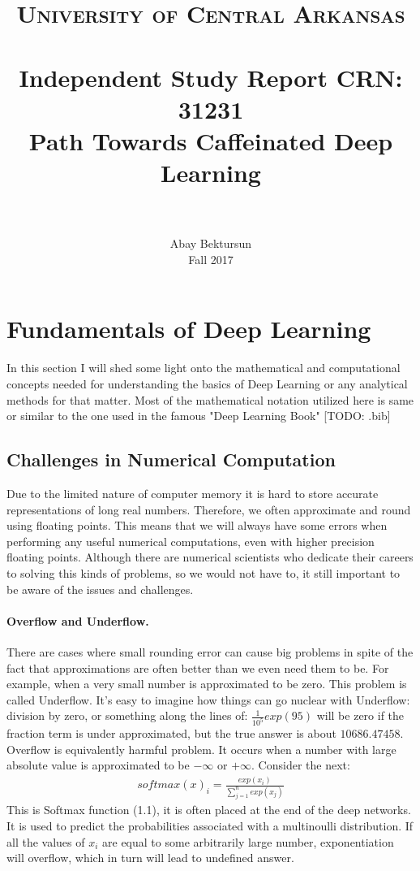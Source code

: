 \documentclass[paper=a4, fontsize=11pt]{scrartcl}
\title{
	\usefont{OT1}{bch}{b}{n}
	\normalfont \normalsize \textsc{University of Central Arkansas} \\ [25pt]
	\horrule{0.5pt} \\[0.4cm]
	\large Independent Study Report CRN: 31231 \\
	\huge Path Towards Caffeinated Deep Learning \\
	\horrule{2pt} \\[0.5cm]
}
\author{
	\normalfont 			\normalsize
	Abay Bektursun\\[-3pt]	\normalsize
	Fall 2017\\[-3pt]	\normalsize
}
\date{}
\numberwithin{equation}{section}		%
\numberwithin{figure}{section}			%
\numberwithin{table}{section}			%
\begin{document}
	
	\maketitle
	\section{Fundamentals of Deep Learning}
		In this section I will shed some light onto the mathematical and computational concepts needed for understanding the basics of Deep Learning or any analytical methods for that matter. Most of the mathematical notation utilized here is same or similar to the one used in the famous "Deep Learning Book" [TODO: .bib]	
	
	\subsection{Challenges in Numerical Computation}
		Due to the limited nature of computer memory it is hard to store accurate representations of long real numbers. Therefore, we often approximate and round using floating points. This means that we will always have some errors when performing any useful numerical computations, even with higher precision floating points. Although there are numerical scientists who dedicate their careers to solving this kinds of problems, so we would not have to, it still important to be aware of the issues and challenges. 
	\paragraph{Overflow and Underflow.}
	There are cases where small rounding error can cause big problems in spite of the fact that approximations are often better than we even need them to be. For example, when a very small number is approximated to be zero. This problem is called Underflow. It's easy to imagine how things can go nuclear with Underflow: division by zero, or something along the lines of: $ \frac{1}{10^5}exp(95) $ will be zero if the fraction term is under approximated, but the true answer is about $ 10686.47458 $. Overflow is equivalently harmful problem. It occurs when a number with large absolute value is approximated to be $-\infty $ or $+\infty $. Consider the next: 
	\begin{align}
	softmax(x)_{i} = \frac{exp(x_{i})}{\sum_{j=1}^{n}exp(x_{j})}
	\end{align}
	This is Softmax function (1.1), it is often placed at the end of the deep networks. It is used to predict the probabilities associated with a multinoulli distribution. If all the values of $ x_{i} $ are equal to some arbitrarily large number, exponentiation will overflow, which in turn will lead to undefined answer. 
\end{document}
